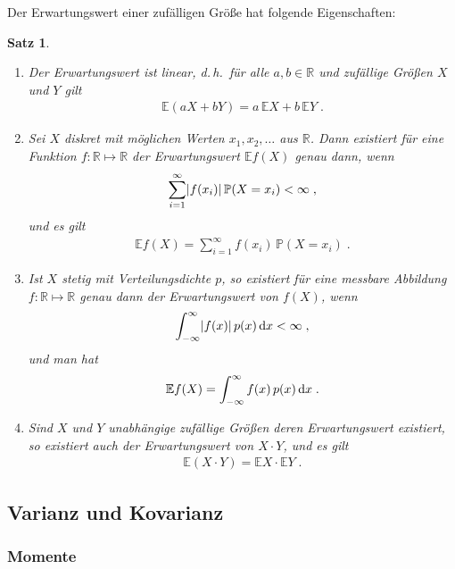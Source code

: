 \documentclass[ngerman,draft,parskip=half,twoside]{scrartcl}
\newtheorem{thm}{Satz}[section]
\DeclarePairedDelimiter{\abs}{\lvert}{\rvert}
\newcommand*{\R}{\mathbb{R}}      %
\newcommand*{\E}{\mathbb{E}}        %
\newcommand*{\WKM}{\mathbb{P}}      %
\newcommand*{\diff}[1]{%
  \mathop{\mathrm{\mathstrut d}}%
  \ifx#1(\else%
  \ifx#1[\else%
  \ifx#1\{\else%
    \!%
  \fi\fi\fi#1%
}
\begin{document}
Der Erwartungswert einer zufälligen Größe hat folgende Eigenschaften:
\begin{thm}~
  \begin{enumerate}
   \item Der Erwartungswert ist linear, d.\,h.~für alle $a,b\in\R$ und
    zufällige Größen $X$ und $Y$ gilt
    \begin{gather*}
      \E(a X+ b Y) = a\,\E X + b\,\E Y\;.
    \end{gather*}

   \item Sei $X$ diskret mit möglichen Werten $x_1,x_2,\dotsc$ aus $\R$. Dann
    existiert für eine Funktion $f \colon\R\mapsto\R$ der Erwartungswert $\E
    f(X)$ genau dann, wenn
    \begin{gather*}
      \sum_{i=1}^\infty \abs{f(x_i)}\,\WKM(X=x_i)<\infty\;,
    \end{gather*}
    und es gilt
    \begin{gather*}
      \E f(X)=\sum_{i=1}^\infty f(x_i)\,\WKM(X=x_i)\;.
    \end{gather*}

   \item Ist $X$ stetig mit Verteilungsdichte $p$, so existiert für eine
    messbare Abbildung $f \colon\R\mapsto\R$ genau dann der Erwartungswert von
    $f(X)$, wenn
    \begin{gather*}
      \int_{-\infty}^\infty \abs{f(x)}\,p(x)\diff{x}<\infty\;,
    \end{gather*}
    und man hat
    \begin{gather*}
      \E f(X)=\int_{-\infty}^\infty  f(x)\,p(x)\diff{x}\;.
    \end{gather*}

   \item Sind $X$ und $Y$ unabhängige zufällige Größen deren Erwartungswert
    existiert, so existiert auch der Erwartungswert von $X\cdot Y$, und es gilt
    \begin{gather*}
      \E(X\cdot Y)= \E X \cdot \E Y\;.
    \end{gather*}
  \end{enumerate}
\end{thm}

\subsection{Varianz und Kovarianz}
\subsubsection{Momente}
\end{document}
